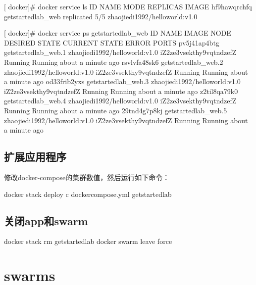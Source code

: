 \documentclass[letterpaper,10pt,english]{sphinxmanual}
\begin{document}
{[} docker{]}\# docker service ls
ID            NAME               MODE        REPLICAS  IMAGE
hf9hawqrchfq  getstartedlab\_web  replicated  5/5       zhaojiedi1992/helloworld:v1.0

{[} docker{]}\# docker service ps getstartedlab\_web
ID            NAME                 IMAGE                          NODE                     DESIRED STATE  CURRENT STATE               ERROR  PORTS
pv5j41ap4btg  getstartedlab\_web.1  zhaojiedi1992/helloworld:v1.0  iZ2ze3vsekthy9vqtndzefZ  Running        Running about a minute ago
rsvlvfa48sk6  getstartedlab\_web.2  zhaojiedi1992/helloworld:v1.0  iZ2ze3vsekthy9vqtndzefZ  Running        Running about a minute ago
od33frib2yxs  getstartedlab\_web.3  zhaojiedi1992/helloworld:v1.0  iZ2ze3vsekthy9vqtndzefZ  Running        Running about a minute ago
z2til8qa79k0  getstartedlab\_web.4  zhaojiedi1992/helloworld:v1.0  iZ2ze3vsekthy9vqtndzefZ  Running        Running about a minute ago
29tnd4g7p8kj  getstartedlab\_web.5  zhaojiedi1992/helloworld:v1.0  iZ2ze3vsekthy9vqtndzefZ  Running        Running about a minute ago


\section{扩展应用程序}
\label{\detokenize{_u5feb_u901f_u5165_u95e8/03-_u670d_u52a1:id3}}
修改docker-compose的集群数值，然后运行如下命令：

%
\begin{sphinxVerbatim}[commandchars=\\\{\}]
docker stack deploy \PYGZhy{}c docker\PYGZhy{}compose.yml getstartedlab
\end{sphinxVerbatim}


\section{关闭app和swarm}
\label{\detokenize{_u5feb_u901f_u5165_u95e8/03-_u670d_u52a1:appswarm}}
%
\begin{sphinxVerbatim}[commandchars=\\\{\}]
docker stack rm getstartedlab
docker swarm leave \PYGZhy{}\PYGZhy{}force
\end{sphinxVerbatim}


\chapter{swarms}
\label{\detokenize{_u5feb_u901f_u5165_u95e8/04-swarms::doc}}\label{\detokenize{_u5feb_u901f_u5165_u95e8/04-swarms:swarms}}
\end{document}
